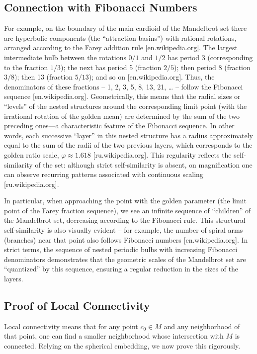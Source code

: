 \documentclass[12pt]{article}
\begin{document}
\subsection*{Connection with Fibonacci Numbers}

For example, on the boundary of the main cardioid of the Mandelbrot set there are hyperbolic components (the ``attraction basins'') with rational rotations, arranged according to the Farey addition rule [en.wikipedia.org]. The largest intermediate bulb between the rotations \(0/1\) and \(1/2\) has period 3 (corresponding to the fraction \(1/3\)); the next has period 5 (fraction \(2/5\)); then period 8 (fraction \(3/8\)); then 13 (fraction \(5/13\)); and so on [en.wikipedia.org]. Thus, the denominators of these fractions -- 1, 2, 3, 5, 8, 13, 21, \ldots{} -- follow the Fibonacci sequence [en.wikipedia.org]. Geometrically, this means that the radial sizes or ``levels'' of the nested structures around the corresponding limit point (with the irrational rotation of the golden mean) are determined by the sum of the two preceding ones---a characteristic feature of the Fibonacci sequence. In other words, each successive ``layer'' in this nested structure has a radius approximately equal to the sum of the radii of the two previous layers, which corresponds to the golden ratio scale, \(\varphi \approx 1.618\) [ru.wikipedia.org]. This regularity reflects the self-similarity of the set: although strict self-similarity is absent, on magnification one can observe recurring patterns associated with continuous scaling [ru.wikipedia.org].

In particular, when approaching the point with the golden parameter (the limit point of the Farey fraction sequence), we see an infinite sequence of ``children'' of the Mandelbrot set, decreasing according to the Fibonacci rule. This structural self-similarity is also visually evident -- for example, the number of spiral arms (branches) near that point also follows Fibonacci numbers [en.wikipedia.org]. In strict terms, the sequence of nested periodic bulbs with increasing Fibonacci denominators demonstrates that the geometric scales of the Mandelbrot set are ``quantized'' by this sequence, ensuring a regular reduction in the sizes of the layers.

\subsection*{Proof of Local Connectivity}

Local connectivity means that for any point \(c_0 \in M\) and any neighborhood of that point, one can find a smaller neighborhood whose intersection with \(M\) is connected. Relying on the spherical embedding, we now prove this rigorously.
\end{document}
